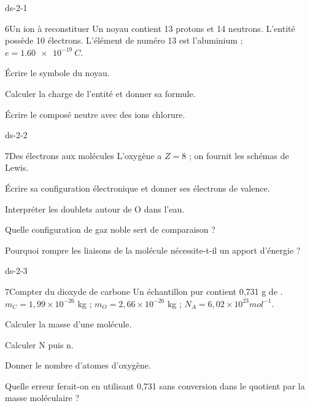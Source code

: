 \begin{blocLivre}{ds-2-1}\begin{exoBac}{6}{Un ion à reconstituer}
Un noyau contient 13 protons et 14 neutrons. L’entité possède 10 électrons. L’élément de numéro 13 est l’aluminium ; $e=\qty{1,60e-19}{C}$.
\begin{questions}
\item Écrire le symbole du noyau.
\item Calculer la charge de l’entité et donner sa formule.
\item Écrire le composé neutre avec des ions chlorure.
\end{questions}
\end{exoBac}\end{blocLivre}
\begin{blocLivre}{ds-2-2}\begin{exoBac}{7}{Des électrons aux molécules}
L’oxygène a $Z=8$ ; on fournit les schémas de Lewis.
\begin{questions}
\item Écrire sa configuration électronique et donner ses électrons de valence.
\item Interpréter les doublets autour de O dans l’eau.
\item Quelle configuration de gaz noble sert de comparaison ?
\item Pourquoi rompre les liaisons de la molécule nécessite-t-il un apport d’énergie ?
\end{questions}
\end{exoBac}\end{blocLivre}
\begin{blocLivre}{ds-2-3}\begin{exoBac}{7}{Compter du dioxyde de carbone}
Un échantillon pur contient 0,731 g de . $m_C=1,99\times10^{-26}$ kg ; $m_O=2,66\times10^{-26}$ kg ; $N_A=6,02\times10^{23}\unit{mol^{-1}}$.
\begin{questions}
\item Calculer la masse d’une molécule.
\item Calculer N puis n.
\item Donner le nombre d’atomes d’oxygène.
\item Quelle erreur ferait-on en utilisant 0,731 sans conversion dans le quotient par la masse moléculaire ?
\end{questions}
\end{exoBac}\end{blocLivre}

